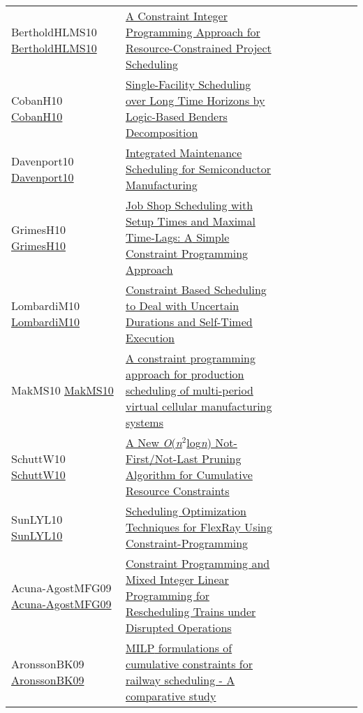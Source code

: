 {\begin{longtable}{p{3cm}p{7cm}lllllll}
BertholdHLMS10 \href{https://doi.org/10.1007/978-3-642-13520-0\_34}{BertholdHLMS10} &  \href{papers/BertholdHLMS10.pdf}{A Constraint Integer Programming Approach for Resource-Constrained Project Scheduling} &  &  &  &  &  &  & \\
CobanH10 \href{https://doi.org/10.1007/978-3-642-13520-0\_11}{CobanH10} &  \href{papers/CobanH10.pdf}{Single-Facility Scheduling over Long Time Horizons by Logic-Based Benders Decomposition} &  &  &  &  &  &  & \\
Davenport10 \href{https://doi.org/10.1007/978-3-642-13520-0\_12}{Davenport10} &  \href{papers/Davenport10.pdf}{Integrated Maintenance Scheduling for Semiconductor Manufacturing} &  &  &  &  &  &  & \\
GrimesH10 \href{https://doi.org/10.1007/978-3-642-13520-0\_19}{GrimesH10} &  \href{papers/GrimesH10.pdf}{Job Shop Scheduling with Setup Times and Maximal Time-Lags: {A} Simple Constraint Programming Approach} &  &  &  &  &  &  & \\
LombardiM10 \href{https://doi.org/10.1007/978-3-642-15396-9\_32}{LombardiM10} &  \href{papers/LombardiM10.pdf}{Constraint Based Scheduling to Deal with Uncertain Durations and Self-Timed Execution} &  &  &  &  &  &  & \\
MakMS10 \href{https://doi.org/10.1109/ICNC.2010.5583494}{MakMS10} &  \href{papers/MakMS10.pdf}{A constraint programming approach for production scheduling of multi-period virtual cellular manufacturing systems} &  &  &  &  &  &  & \\
SchuttW10 \href{https://doi.org/10.1007/978-3-642-15396-9\_36}{SchuttW10} &  \href{papers/SchuttW10.pdf}{A New \emph{O}(\emph{n}\({}^{\mbox{2}}\)log\emph{n}) Not-First/Not-Last Pruning Algorithm for Cumulative Resource Constraints} &  &  &  &  &  &  & \\
SunLYL10 \href{https://doi.org/10.1109/GreenCom-CPSCom.2010.111}{SunLYL10} &  \href{papers/SunLYL10.pdf}{Scheduling Optimization Techniques for FlexRay Using Constraint-Programming} &  &  &  &  &  &  & \\
Acuna-AgostMFG09 \href{https://doi.org/10.1007/978-3-642-01929-6\_24}{Acuna-AgostMFG09} &  \href{papers/Acuna-AgostMFG09.pdf}{Constraint Programming and Mixed Integer Linear Programming for Rescheduling Trains under Disrupted Operations} &  &  &  &  &  &  & \\
AronssonBK09 \href{http://drops.dagstuhl.de/opus/volltexte/2009/2141}{AronssonBK09} &  \href{papers/AronssonBK09.pdf}{{MILP} formulations of cumulative constraints for railway scheduling - {A} comparative study} &  &  &  &  &  &  & \\

\end{longtable}}
